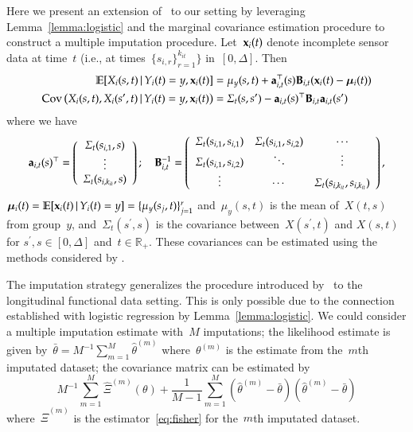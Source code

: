 \documentclass[11pt]{amsart}
\def\E{\mathcal{E}}
\def\E{\mathbb{E}}
\def\given{\, | \,}
\def\bfx{{\bf x}}
\begin{document}
Here we present an extension of~\cite{Petrovich2018} to our setting by leveraging Lemma~\ref{lemma:logistic} and the marginal covariance estimation procedure to construct a multiple imputation procedure. Let~$\bfx_{i} (t)$ denote incomplete sensor data at time~$t$ (i.e., at times~$\{ s_{i,r} \}_{r=1}^{k_{it}} \}$ in~$[0,\Delta]$. Then
\begin{align}
\label{eq:impute}
\E [ X_i (s,t) \given Y_i(t) = y, \bfx_i (t) ]
  &= \mu_y (s,t) + {\bf a}_{i,t}^\top (s) {\bf B}_{i,t} (\bfx_i (t) -
    \mathbold{\mu}_i (t) ) \\
\text{Cov} \left( X_i (s,t), X_i (s^\prime, t) \given Y_i (t) = y,
  \bfx_i (t) \right)
  &= \Sigma_{t} (s, s^\prime) -
    {\bf a}_{i,t} (s)^\top {\bf B}_{i,t} {\bf a}_{i,t} (s^\prime)
\end{align}
where we have
\[
{\bf a}_{i,t} (s)^\top = \left( \begin{array}{c} \Sigma_t (s_{i,1}, s) \\ \vdots \\
                       \Sigma_t (s_{i,k_{it}}, s) \end{array} \right); \quad
{\bf B}_{i,t}^{-1} = \left(
  \begin{array}{c c c}
    \Sigma_t(s_{i,1}, s_{i,1}) & \Sigma_t(s_{i,1}, s_{i,2}) & \cdots \\
    \Sigma_t(s_{i,1}, s_{i,2}) & \ddots & \vdots \\
    \vdots & \cdots & \Sigma_t (s_{i,k_{it}}, s_{i,k_{it}})
  \end{array} \right),
\]
$\mathbold{\mu}_i (t) = \E [ \bfx_i (t) \given Y_i (t) = y] = \{
\mu_y (s_{j}, t) \}_{j=1}^r$ and~$\mu_y (s,t)$ is the mean of~$X(t,s)$
from group~$y$, and~$\Sigma_t ( s^\prime, s)$ is the covariance
between~$X(s^\prime,t)$ and $X(s,t)$ for $s^\prime, s \in [0, \Delta]$
and~$t \in \mathbb{R}_+$.
These covariances can be estimated using the methods considered by
\cite{ChenMuller2012}.

The imputation strategy generalizes the procedure introduced by~\cite{Petrovich2018} to the longitudinal functional data setting.  This is only possible due to the connection established with logistic regression by Lemma~\ref{lemma:logistic}. We could consider a multiple imputation estimate with~$M$ imputations; the likelihood estimate is given by~$\bar \theta = M^{-1} \sum_{m=1}^M \hat \theta^{(m)}$ where~$\theta^{(m)}$ is the estimate from the~$m$th imputated dataset; the covariance matrix can be estimated by
\[
M^{-1} \sum_{m=1}^M \hat \Xi^{(m)} (\theta) + \frac{1}{M-1}
\sum_{m=1}^M (\hat \theta^{(m)} - \bar \theta) (\hat \theta^{(m)} -
\bar \theta)
\]
where~$\hat \Xi^{(m)}$ is the estimator~\eqref{eq:fisher} for
the~$m$th imputated dataset.
\end{document}
